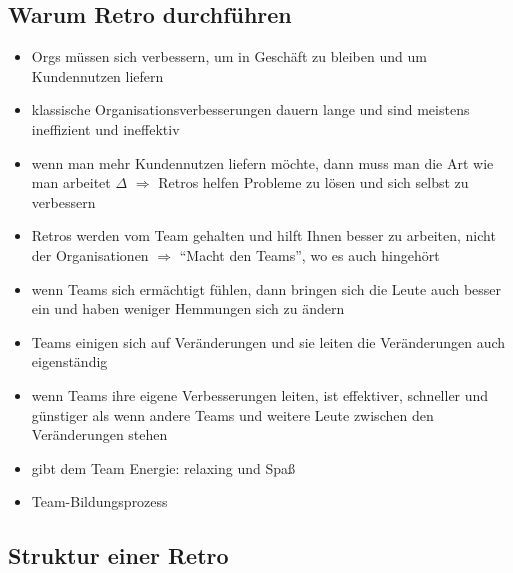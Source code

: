 \subsection{Warum Retro durchführen}
\begin{itemize}
  \item Orgs müssen sich verbessern, um in Geschäft zu bleiben und um Kundennutzen
    liefern
  \item klassische Organisationsverbesserungen dauern lange und sind meistens ineffizient und
    ineffektiv
  \item wenn man mehr Kundennutzen liefern möchte, dann muss man die Art wie man arbeitet
    $\Delta$ $\Rightarrow$  Retros helfen Probleme zu lösen und sich selbst zu verbessern
  \item Retros werden vom Team gehalten und hilft Ihnen besser zu arbeiten, nicht der
    Organisationen $\Rightarrow$ \enquote{Macht den Teams}, wo es auch hingehört
  \item wenn Teams sich ermächtigt fühlen, dann bringen sich die Leute auch besser ein und haben weniger Hemmungen sich zu ändern
  \item Teams einigen sich auf Veränderungen und sie leiten die Veränderungen auch eigenständig
  \item wenn Teams ihre eigene Verbesserungen leiten, ist effektiver, schneller und günstiger als
    wenn andere Teams und weitere Leute zwischen den Veränderungen stehen
  \item gibt dem Team Energie: relaxing und Spaß
  \item Team-Bildungsprozess
\end{itemize}


\subsection{Struktur einer Retro}

